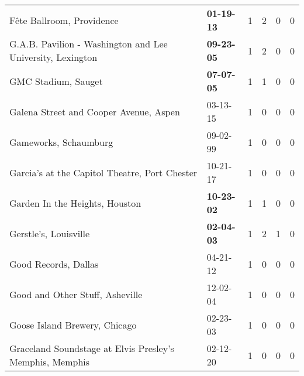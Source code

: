 \begin{longtable}{p{}p{}p{}p{}p{}p{}}
                                                    Fête Ballroom, Providence &                                       \textbf{01-19-13\textsuperscript{}} &  1 &  2 &  0 &  0 \\
                   G.A.B. Pavilion - Washington and Lee University, Lexington &                                       \textbf{09-23-05\textsuperscript{}} &  1 &  2 &  0 &  0 \\
                                                          GMC Stadium, Sauget &                                       \textbf{07-07-05\textsuperscript{}} &  1 &  1 &  0 &  0 \\
                                       Galena Street and Cooper Avenue, Aspen &                                                03-13-15\textsuperscript{} &  1 &  0 &  0 &  0 \\
                                                        Gameworks, Schaumburg &                                                09-02-99\textsuperscript{} &  1 &  0 &  0 &  0 \\
                                Garcia’s at the Capitol Theatre, Port Chester &                                                10-21-17\textsuperscript{} &  1 &  0 &  0 &  0 \\
                                               Garden In the Heights, Houston &                                       \textbf{10-23-02\textsuperscript{}} &  1 &  1 &  0 &  0 \\
                                                        Gerstle's, Louisville &                                       \textbf{02-04-03\textsuperscript{}} &  1 &  2 &  1 &  0 \\
                                                         Good Records, Dallas &                                                04-21-12\textsuperscript{} &  1 &  0 &  0 &  0 \\
                                              Good and Other Stuff, Asheville &                                                12-02-04\textsuperscript{} &  1 &  0 &  0 &  0 \\
                                                Goose Island Brewery, Chicago &                                                02-23-03\textsuperscript{} &  1 &  0 &  0 &  0 \\
                     Graceland Soundstage at Elvis Presley’s Memphis, Memphis &                                                02-12-20\textsuperscript{} &  1 &  0 &  0 &  0 \\

\end{longtable}

